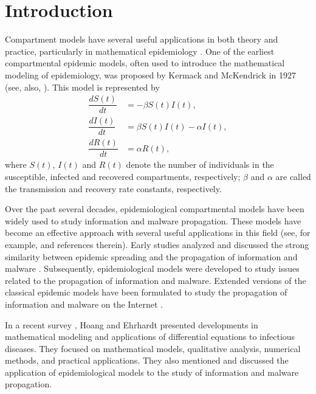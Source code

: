 \documentclass[11pt]{article}
\theoremstyle{definition}
\theoremstyle{remark}
\numberwithin{equation}{section}
\begin{document}
\section{Introduction}\label{intro}
Compartment models have several useful applications in both theory and practice, particularly in mathematical epidemiology \cite{Allen, Angstmann, Brauer, Kermack-McKendrick, Kermack-McKendrick1, Kermack-McKendrick2, Martcheva}. 
One of the earliest compartmental epidemic models, often used to introduce the mathematical modeling of epidemiology, was proposed by Kermack and McKendrick in 1927 \cite{Kermack-McKendrick} (see, also, \cite{Martcheva}). 
This model is represented by
\begin{equation}\label{eq:SIR}
\begin{split}
\dfrac{dS(t)}{dt} &= -\beta S(t) I(t),\\
\dfrac{dI(t)}{dt} &= \beta S(t) I(t) - \alpha I(t),\\
\dfrac{dR(t)}{dt} &= \alpha R(t),
\end{split}
\end{equation}
where $S(t)$, $I(t)$ and $R(t)$ denote the number of individuals in the susceptible, infected and recovered compartments, respectively; $\beta$ and $\alpha$ are called the transmission and recovery rate constants, respectively.

Over the past several decades, epidemiological compartmental models have been widely used to study information and malware propagation. These models have become an effective approach with several useful applications in this field 
(see, for example, \cite{Daley, delRey, Dietz, Ding, Goffman, Kawachi, Murray, Piqueira1, Piqueira2, Piqueira3, Piqueira4, Zhu} and references therein).  
Early studies analyzed and discussed the strong similarity between epidemic spreading and the propagation of information and malware \cite{Daley, Dietz, Goffman, Murray}. 
Subsequently, epidemiological models were developed to study issues related to the propagation of information and malware. 
Extended versions of the classical epidemic models \cite{Kermack-McKendrick, Kermack-McKendrick1, Kermack-McKendrick2} have been formulated to study the propagation of information and malware on the Internet 
 \cite{Kawachi, Piqueira1, Piqueira2, Piqueira3, Piqueira4, Zhu}.

In a recent survey \cite{HoangMatthias}, Hoang and Ehrhardt presented developments in mathematical modeling and applications of differential equations to infectious diseases. 
They focused on mathematical models, qualitative analysis, numerical methods, and practical applications.
They also mentioned and discussed the application of epidemiological models to the study of information and malware propagation.
\end{document}
